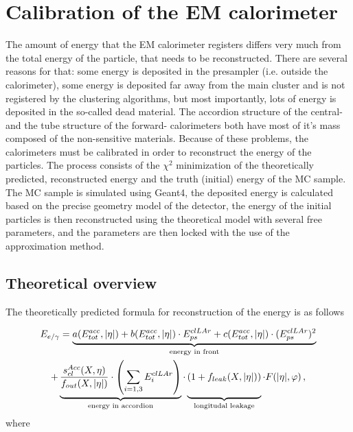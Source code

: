 \chapter{Calibration of the EM calorimeter}
\label{sec:Calibration}

The amount of energy that the EM calorimeter registers differs very much from the total energy of the particle, that needs to be reconstructed. There are several reasons for that: some energy is deposited in the presampler (i.e. outside the calorimeter), some energy is deposited far away from the main cluster and is not registered by the clustering algorithms, but most importantly, lots of energy is deposited in the so-called dead material. The accordion structure of the central- and the tube structure of the forward- calorimeters both have most of it's mass composed of the non-sensitive materials. Because of these problems, the calorimeters must be calibrated in order to reconstruct the energy of the particles. The process consists of the $\chi^{2}$ minimization of the theoretically predicted, reconstructed energy and the truth (initial) energy of the MC sample. The MC sample is simulated using Geant4, the deposited energy is calculated based on the precise geometry model of the detector, the energy of the initial particles is then reconstructed using the theoretical model with several free parameters, and the parameters are then locked with the use of the approximation method.

\section{Theoretical overview}

The theoretically predicted formula for reconstruction of the energy is as follows

\begin{equation}
\label{eq:calib_theory}
\begin{gathered}
E_{e/\gamma} = \underbrace{a(E^{acc}_{tot}, |\eta|) + b (E^{acc}_{tot}, |\eta|) \cdot E^{clLAr}_{ps} + c (E^{acc}_{tot}, |\eta|) \cdot (E^{clLAr}_{ps})^{2}}_\text{energy in front} \\
+ \underbrace{\frac{s^{Acc}_{cl}(X,\eta)}{f_{out}(X,|\eta|)} \cdot \left( \sum\limits_{i=1,3} E^{clLAr}_{i} \right)}_\text{energy in accordion}
 \cdot \underbrace{(1+f_{leak}(X,|\eta|)) \vphantom{\left( \sum\limits_{i=1,3} E^{clLAr}_{i} \right)}}_\text{longitudal leakage}
 \cdot F(|\eta|,\varphi) \,,
\end{gathered}
\end{equation}
where

